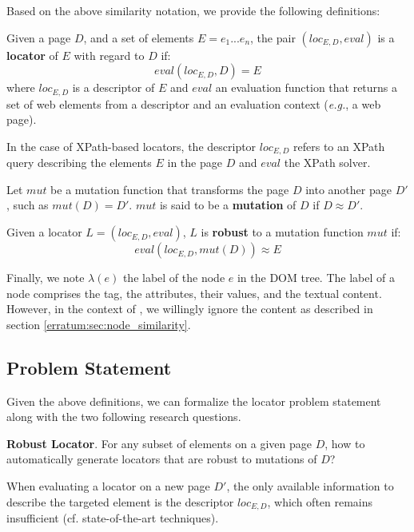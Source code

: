 
Based on the above similarity notation, we provide the following definitions:
\begin{defn}\label{loc_def}
    Given a page $D$, and a set of elements $E = {e_1...e_n}$, the pair $(loc_{E,D}, eval)$ is a \textbf{locator} of $E$ with regard to $D$ if:
    \begin{equation}
       eval(loc_{E,D}, D) = E
    \end{equation}
    where $loc_{E,D}$ is a descriptor of $E$ and $eval$ an evaluation function that returns a set of web elements from a descriptor and an evaluation context (\emph{e.g.}, a web page).
\end{defn}
In the case of XPath-based locators, the descriptor $loc_{E,D}$ refers to an XPath query describing the elements $E$ in the page $D$ and $eval$ the XPath solver.

\begin{defn}
    Let $mut$ be a mutation function that transforms the page $D$ into another page $D'$, such as $mut(D) = D'$.
    $mut$ is said to be a \textbf{mutation} of $D$ if $D \approx D'$.
\end{defn}

\begin{defn}
    Given a locator $L = (loc_{E,D}, eval)$, $L$ is \textbf{robust} to a mutation function $mut$ if:
    \begin{equation}
       eval(loc_{E, D}, mut(D)) \approx E
    \end{equation}
\end{defn}

Finally, we note $\lambda(e)$ the label of the node $e$ in the DOM tree. The label of a node comprises the tag, the attributes, their values, and the textual content. However, in the context of \erratum, we willingly ignore the content as described in section \ref{erratum:sec:node_similarity}.

\subsection{Problem Statement}
Given the above definitions, we can formalize the locator problem statement along with the two following research questions.
\begin{rqn}\label{robust_locator_problem} %
    \textbf{Robust Locator}. 
    For any subset of elements on a given page $D$, how to automatically generate locators that are robust to mutations of $D$?
\end{rqn}
When evaluating a locator on a new page $D'$, the only available information to describe the targeted element is the descriptor $loc_{E,D}$, which often remains insufficient (cf. state-of-the-art techniques).


